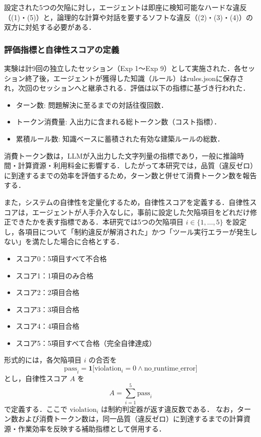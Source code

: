 \documentclass[dvipdfmx, a4paper, 9pt]{deimj}
\begin{document}
設定された5つの欠陥に対し，エージェントは即座に検知可能なハードな違反（(1)・(5)）と，論理的な計算や対話を要するソフトな違反（(2)・(3)・(4)）の双方に対処する必要がある．

\subsubsection{評価指標と自律性スコアの定義}

実験は計9回の独立したセッション（Exp 1〜Exp 9）として実施された．各セッション終了後，エージェントが獲得した知識（ルール）はrules.jsonに保存され，次回のセッションへと継承される．評価は以下の指標に基づき行われた．

\begin{itemize}
    \item ターン数: 問題解決に至るまでの対話往復回数．
    \item トークン消費量: 入出力に含まれる総トークン数（コスト指標）．
    \item 累積ルール数: 知識ベースに蓄積された有効な建築ルールの総数．
\end{itemize}

消費トークン数は，LLMが入出力した文字列量の指標であり，一般に推論時間・計算資源・利用料金に影響する．したがって本研究では，品質（違反ゼロ）に到達するまでの効率を評価するため，ターン数と併せて消費トークン数を報告する．

また，システムの自律性を定量化するため，自律性スコアを定義する．自律性スコアは，エージェントが人手介入なしに，事前に設定した欠陥項目をどれだけ修正できたかを表す指標である．本研究では5つの欠陥項目 $i \in \{1,\dots,5\}$ を設定し，各項目について「制約違反が解消された」かつ「ツール実行エラーが発生しない」を満たした場合に合格とする．

\begin{itemize}
    \item スコア0：5項目すべて不合格
    \item スコア1：1項目のみ合格
    \item スコア2：2項目合格
    \item スコア3：3項目合格
    \item スコア4：4項目合格
    \item スコア5：5項目すべて合格（完全自律達成）
\end{itemize}

形式的には，各欠陥項目 $i$ の合否を
\begin{equation}
\text{pass}_i = \mathbf{1}\big[\text{violation}_i = 0 \land \text{no\_runtime\_error}\big]
\end{equation}
とし，自律性スコア $A$ を
\begin{equation}
A = \sum_{i=1}^{5}\text{pass}_i
\end{equation}
で定義する．ここで $\text{violation}_i$ は制約判定器が返す違反数である．
なお，ターン数および消費トークン数は，同一品質（違反ゼロ）に到達するまでの計算資源・作業効率を反映する補助指標として併用する．
\end{document}
